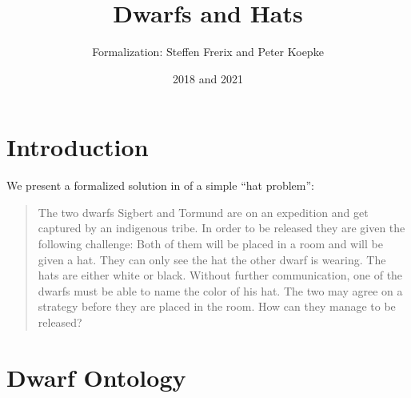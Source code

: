 \documentclass{article}
\title{Dwarfs and Hats}
\author{\Naproche Formalization: Steffen Frerix and Peter Koepke}
\date{2018 and 2021}
\begin{document}
\maketitle

\section{Introduction}

We present a formalized solution in \Naproche of a simple ``hat problem'':

\begin{quotation}
  \noindent The two dwarfs Sigbert and Tormund are on an expedition and get captured by an indigenous tribe.
  In order to be released they are given the following challenge:
  Both of them will be placed in a room and will be given a hat.
  They can only see the hat the other dwarf is wearing.
  The hats are either white or black.
  Without further communication, one of the dwarfs must be able to name the color of his hat.
  The two may agree on a strategy before they are placed in the room.
  How can they manage to be released?
\end{quotation}


\section{Dwarf Ontology}
\end{document}
